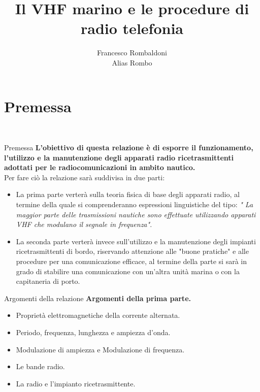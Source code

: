\documentclass[aspectratio=169]{beamer}
\title{Il VHF marino e le procedure di radio telefonia}
\author{Francesco Rombaldoni\\
Alias Rombo}
\date{}
\institute{Università degli Studi di Urbino "Carlo Bo"}
\begin{document}
	
	\begin{frame} 
		\maketitle 		
	\end{frame}
	
	\begin{frame}[label = index]
		\tableofcontents
	\end{frame}

	\section{Premessa}
	\begin{frame}
		\centering{{\textcolor{blue!80}{\huge{\textbf{Premessa}}}}}\\
	\end{frame}

	\begin{frame}{Premessa}
		\textbf{L'obiettivo di questa relazione è di esporre il funzionamento, l'utilizzo e la manutenzione degli apparati radio ricetrasmittenti adottati per le radiocomunicazioni in ambito nautico.}\\
		\bigskip
		Per fare ciò la relazione sarà suddivisa in due parti:\\
		\begin{itemize}
			\item La prima parte verterà sulla teoria fisica di base degli apparati radio, al termine della quale si comprenderanno espressioni linguistiche del tipo: \emph{" La maggior parte delle trasmissioni nautiche sono effettuate utilizzando apparati VHF che modulano il segnale in frequenza"}.\\
			\item La seconda parte verterà invece sull'utilizzo e la manutenzione degli impianti ricetrasmittenti di bordo, riservando attenzione alle "buone pratiche" e alle procedure per una comunicazione efficace, al termine della parte si sarà in grado di stabilire una comunicazione con un'altra unità marina o con la capitaneria di porto.
		\end{itemize}
	\end{frame}

	\begin{frame}{Argomenti della relazione}
		\textbf{Argomenti della prima parte.}
		\begin{itemize}
			\item Proprietà elettromagnetiche della corrente alternata.
			\item Periodo, frequenza, lunghezza e ampiezza d'onda.
			\item Modulazione di ampiezza e Modulazione di frequenza.
			\item Le bande radio.
			\item La radio e l'impianto ricetrasmittente.
		\end{itemize}
	\end{frame}
\end{document}
